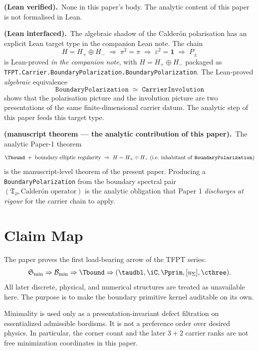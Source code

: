 \begin{tfptstatusbox}
\textbf{ (Lean verified).}\ None in this paper's
body. The analytic content of this paper is not formalised
in Lean.

\smallskip\noindent
\textbf{ (Lean interfaced).}\ The algebraic shadow of
the Calder\'on polarisation has an explicit Lean target type
in the companion Lean note. The chain
\[
H = H_+ \oplus H_-
\;\Rightarrow\;
\pi^2 = \pi
\;\Rightarrow\;
\varepsilon^2 = \mathbf 1
\;\Rightarrow\;
P_\pm
\]
is Lean-proved  \emph{in the companion note},
with $H = H_+ \oplus H_-$ packaged as
\texttt{TFPT.Carrier.BoundaryPolarization.BoundaryPolarization}.
The Lean-proved \emph{algebraic} equivalence
\[
\texttt{BoundaryPolarization}
\;\;\simeq\;\;
\texttt{CarrierInvolution}
\]
shows that the polarisation picture and the involution picture
are two presentations of the same finite-dimensional carrier
datum. The analytic step of this paper feeds this target type.

\smallskip\noindent
\textbf{ (manuscript theorem --- the analytic
contribution of this paper).}\ The analytic Paper-1 theorem
\[
\Tbound
\;+\;
\text{boundary elliptic regularity}
\;\Rightarrow\;
H = H_+ \oplus H_-
\;\text{(i.e.\ inhabitant of \texttt{BoundaryPolarization})}
\]
is the manuscript-level theorem of the present paper.
Producing a \texttt{BoundaryPolarization} from the boundary
spectral pair $(\mathfrak T_\partial, \text{Calder\'on
operator})$ is the analytic obligation that Paper 1
\emph{discharges at  rigour} for the carrier chain
to apply.
\end{tfptstatusbox}

\tableofcontents

\section{Claim Map}

The paper proves the first load-bearing arrow of the TFPT series:
\[
\mathfrak S_{\min}
\Rightarrow
\mathcal B_{\min}
\Rightarrow
\Tbound
\Rightarrow
(\taudbl,\iC,\Pprim,[u_\Sigma],\cthree).
\]
All later discrete, physical, and numerical structures are treated as unavailable here. The purpose
is to make the boundary primitive kernel auditable on its own.

\begin{tfptwarningbox}
Minimality is used only as a presentation-invariant defect filtration on essentialized admissible
bordisms. It is not a preference order over desired physics. In particular, the corner count and
the later $3+2$ carrier ranks are not free minimization coordinates in this paper.
\end{tfptwarningbox}

